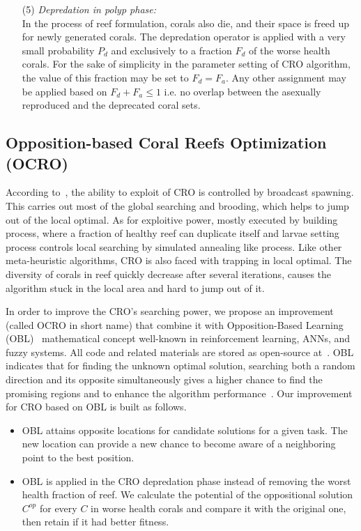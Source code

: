 \documentclass[11pt,twoside]{article}
\begin{document}
\begin{multicols}{2}
\begin{enumerate}
\item[(5)] \textit{Depredation in polyp phase:} \\
In the process of reef formulation, corals also die, and their space is freed up for newly generated corals. The depredation operator is applied with a very small probability $P_d$ and exclusively to a fraction $F_d$ of the worse health corals. For the sake of simplicity in the parameter setting of CRO algorithm, the value of this fraction may be set to $F_d=F_a$. Any other assignment may be applied based on $F_d+F_a\leq1$ i.e. no overlap between the asexually reproduced and the deprecated coral sets.
\end{enumerate}

\subsection{Opposition-based Coral Reefs Optimization (OCRO)}		
\label{ocro}

According to~\citep{ref_salcedo_sanz5}, the ability to exploit of CRO is controlled by broadcast spawning. This carries out most of the global searching and brooding, which helps to jump out of the local optimal. As for exploitive power, mostly executed by building process, where a fraction of healthy reef can duplicate itself and larvae setting process controls local searching by simulated annealing like process. Like other meta-heuristic algorithms, CRO is also faced with trapping in local optimal. The diversity of corals in reef quickly decrease after several iterations, causes the algorithm stuck in the local area and hard to jump out of it. 

In order to improve the CRO's searching power, we propose an improvement (called OCRO in short name) that combine it with Opposition-Based Learning (OBL)~\citep{ref_Tizhoosh} mathematical concept well-known in reinforcement learning, ANNs, and fuzzy systems. All code and related materials are stored as open-source at~\citep{thieu2009ocro}. OBL indicates that for finding the unknown optimal solution, searching both a random direction and its opposite simultaneously gives a higher chance to find the promising regions and to enhance the algorithm performance~\citep{mahdavi2018opposition}. Our improvement for CRO based on OBL is built as follows.

\begin{itemize}
	\item OBL attains opposite locations for candidate solutions for a given task. The new location can provide a new chance to become aware of a neighboring point to the best position. 
	\item OBL is applied in the CRO depredation phase instead of removing the worst health fraction of reef. We calculate the potential of the oppositional solution $C^{op}$ for every $C$ in worse health corals and compare it with the original one, then retain if it had better fitness.
\end{itemize}


\end{multicols}
\end{document}
